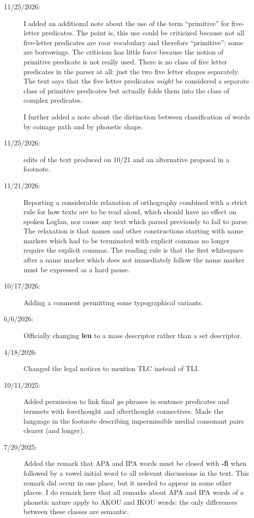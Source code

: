 \documentclass[12pt]{book}
\begin{document}
\begin{description}
\item[11/25/2026:]  I added an additional note about the use of the term ``primitive'' for five-letter predicates.  The point is, this use could be criticized because not all five-letter predicates are roor vocabulary and therefore ``primitive'':  some are borrowings.  The criticism has little force because the notion of primitive predicate is not really used.  There is no class of five letter predicates in the parser at all:  just the two five letter shapes separately.  The text says that the five letter predicates {\em might\/} be considered a separate class of primitive predicates but actually folds them into the class of complex predicates.

I further added a note about the distinction between classification of words by coinage path and by phonetic shape.

\item[11/25/2026:] edits of the text produced on 10/21 and an alternative proposal in a footnote.

\item[11/21/2026:]  Reporting a considerable relaxation of orthography combined with a strict rule for how texts are to be read aloud, which should have no effect on spoken Loglan, nor cause any text which parsed previously to fail to parse.  The relaxation is that names and other constructions starting with name markers which had to be terminated with explicit commas no longer require the explicit commas.  The reading rule is that the first whitespace after a name marker which does not immediately follow the name marker must be expressed as a hard pause.

\item[10/17/2026:]  Adding a comment permitting some typographical variants.

\item[6/6/2026:]  Officially changing {\bf leu} to a mass descriptor rather than a set descriptor.

\item[4/18/2026:]  Changed the legal notices to mention TLC instead of TLI.

\item[10/11/2025:]  Added permission to link final {\em go} phrases in sentence predicates and termsets with forethought and afterthought connectives.  Made the language in the footnote describing impermissible medial consonant pairs clearer (and longer).
\item[7/20/2025:]  Added the remark that APA and IPA words must be closed with {\bf -fi} when followed by a vowel initial word to all relevant discussions in the text.  This remark did occur in one place, but it needed to appear in some other places.  I do remark here that all remarks about APA and IPA words of a phonetic nature apply to AKOU and IKOU words:  the only differences between these classes are semantic.


\end{description}
\end{document}
